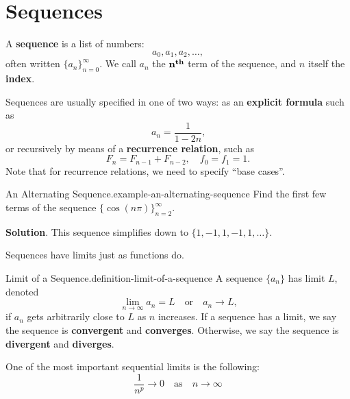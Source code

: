 \documentclass[10pt,]{book}
\newcommand{\terminology}[1]{\textbf{#1}}
\numberwithin{equation}{section}
\begin{document}
\section[{Sequences}]{Sequences}\label{section-sequences}
\hypertarget{p-786}{}%
A \terminology{sequence} is a list of numbers:%
\begin{equation*}
a_{0}, a_{1}, a_{2}, \ldots,
\end{equation*}
often written \(\{a_{n}\}_{n=0}^{\infty}\). We call \(a_{n}\) the \(\mathbf{n}^{\text{\textbf{th}}}\) term of the sequence, and \(n\) itself the \terminology{index}.%
\par
\hypertarget{p-787}{}%
Sequences are usually specified in one of two ways: as an \terminology{explicit formula} such as%
\begin{equation*}
a_{n} = \frac{1}{1 - 2n}\text{,}
\end{equation*}
or recursively by means of a \terminology{recurrence relation}, such as%
\begin{equation*}
F_{n} = F_{n-1} + F_{n-2}, \quad f_{0} = f_{1} = 1.
\end{equation*}
Note that for recurrence relations, we need to specify ``base cases''.%
\begin{example}{An Alternating Sequence.}{example-an-alternating-sequence}%
\hypertarget{p-788}{}%
Find the first few terms of the sequence \(\{\cos(n\pi)\}_{n=2}^{\infty}\).%
\par\smallskip%
\noindent\textbf{Solution}.\hypertarget{solution-162}{}\quad%
\hypertarget{p-789}{}%
This sequence simplifies down to \(\{1, -1, 1, -1, 1, \ldots\}\).%
\end{example}
\hypertarget{p-790}{}%
Sequences have limits just as functions do.%
\begin{definition}{Limit of a Sequence.}{definition-limit-of-a-sequence}%
\hypertarget{p-791}{}%
A sequence \(\{a_{n}\}\) has limit \(L\), denoted%
\begin{equation*}
\lim_{n\to\infty}a_{n} = L \quad \text{or} \quad a_{n}\to L\text{,}
\end{equation*}
if \(a_{n}\) gets arbitrarily close to \(L\) as \(n\) increases. If a sequence has a limit, we say the sequence is \terminology{convergent} and \terminology{converges}. Otherwise, we say the sequence is \terminology{divergent} and \terminology{diverges}.%
\end{definition}
\hypertarget{p-792}{}%
One of the most important sequential limits is the following:%
\begin{equation*}
\frac{1}{n^{p}}\to 0\quad\text{as}\quad n\to\infty
\end{equation*}
\end{document}
